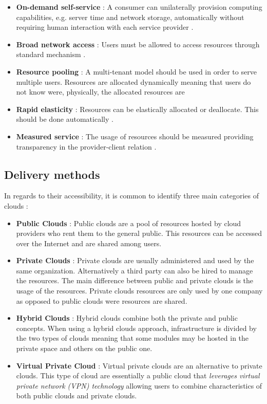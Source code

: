         \begin{itemize}
            \item \textbf{On-demand self-service} : A consumer can unilaterally provision computing capabilities, e.g. server time and network storage, automatically without requiring human interaction with each service provider \cite{Mell2011}.
            \item \textbf{Broad network access} :  Users must be allowed to access resources through standard mechanism \cite{Mell2011}.
            \item \textbf{Resource pooling} : A multi-tenant model should be used in order to serve multiple users. Resources are allocated dynamically meaning that users do not know were, physically, the allocated resources are \cite{Garrison2012}
            \item \textbf{Rapid elasticity} : Resources can be elastically allocated or deallocate. This should be done automatically \cite{Mell2011}.
            \item \textbf{Measured service} : The usage of resources should be measured providing transparency in the provider-client relation \cite{Mell2011}.
  	    \end{itemize}

        \subsection{Delivery methods} \label{chap:stateoftheheart:sec:cloud:sec:deliverymethods}
          In regards to their accessibility, it is common to identify three main categories of clouds \cite{Zhang2010} :
        	\begin{itemize}
            	\item \textbf{Public Clouds} : Public clouds are a pool of resources hosted by cloud providers who rent them to the general public. This resources can be accessed over the Internet and are shared among users.

    		      \item \textbf{Private Clouds} : Private clouds are usually administered and used by the same organization. Alternatively a third party can also be hired to manage the resources. The main difference between public and private clouds is the usage of the resources. Private clouds resources are only used by one company as opposed to public clouds were resources are shared.

              \item \textbf{Hybrid Clouds} : Hybrid clouds combine both the private and public concepts. When using a hybrid clouds approach, infrastructure is divided by the two types of clouds meaning that some modules may be hosted in the private space and others on the public one.

              \item \textbf{Virtual Private Cloud} : Virtual private clouds are an alternative to private clouds. This type of cloud are essentially a public cloud that \textit{leverages virtual private network (VPN) technology} \cite{Zhang2010} allowing users to combine characteristics of both public clouds and private clouds.
    		\end{itemize}

